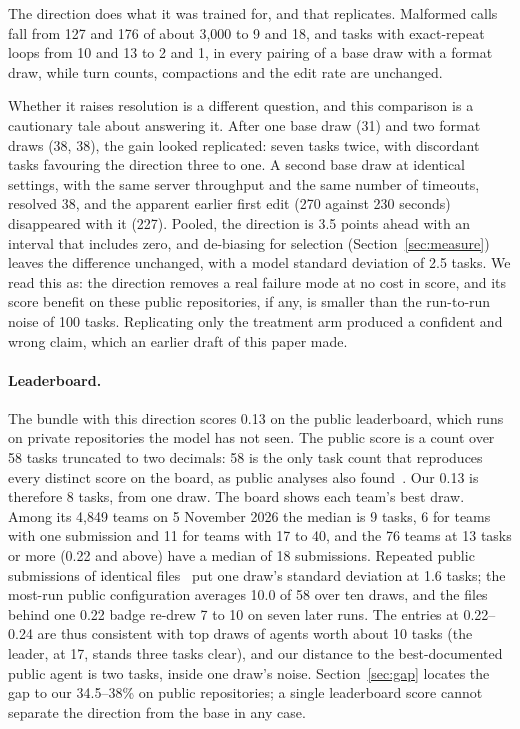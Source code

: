 \documentclass[11pt]{article}
\begin{document}
The direction does what it was trained for, and that replicates. Malformed calls fall from 127 and 176 of about 3,000 to 9 and 18, and tasks with exact-repeat loops from 10 and 13 to 2 and 1, in every pairing of a base draw with a format draw, while turn counts, compactions and the edit rate are unchanged.

Whether it raises resolution is a different question, and this comparison is a cautionary tale about answering it. After one base draw (31) and two format draws (38, 38), the gain looked replicated: seven tasks twice, with discordant tasks favouring the direction three to one. A second base draw at identical settings, with the same server throughput and the same number of timeouts, resolved 38, and the apparent earlier first edit (270 against 230 seconds) disappeared with it (227). Pooled, the direction is 3.5 points ahead with an interval that includes zero, and de-biasing for selection (Section~\ref{sec:measure}) leaves the difference unchanged, with a model standard deviation of 2.5 tasks. We read this as: the direction removes a real failure mode at no cost in score, and its score benefit on these public repositories, if any, is smaller than the run-to-run noise of 100 tasks. Replicating only the treatment arm produced a confident and wrong claim, which an earlier draft of this paper made.

\paragraph{Leaderboard.} The bundle with this direction scores 0.13 on the public leaderboard, which runs on private repositories the model has not seen. The public score is a count over 58 tasks truncated to two decimals: 58 is the only task count that reproduces every distinct score on the board, as public analyses also found~\citep{afshar2026draws}. Our 0.13 is therefore 8 tasks, from one draw. The board shows each team's best draw. Among its 4,849 teams on 5 November 2026 the median is 9 tasks, 6 for teams with one submission and 11 for teams with 17 to 40, and the 76 teams at 13 tasks or more (0.22 and above) have a median of 18 submissions. Repeated public submissions of identical files~\citep{afshar2026draws,gluzdov2026evidence} put one draw's standard deviation at 1.6 tasks; the most-run public configuration averages 10.0 of 58 over ten draws, and the files behind one 0.22 badge re-drew 7 to 10 on seven later runs. The entries at 0.22--0.24 are thus consistent with top draws of agents worth about 10 tasks (the leader, at 17, stands three tasks clear), and our distance to the best-documented public agent is two tasks, inside one draw's noise. Section~\ref{sec:gap} locates the gap to our 34.5--38\% on public repositories; a single leaderboard score cannot separate the direction from the base in any case.
\end{document}
